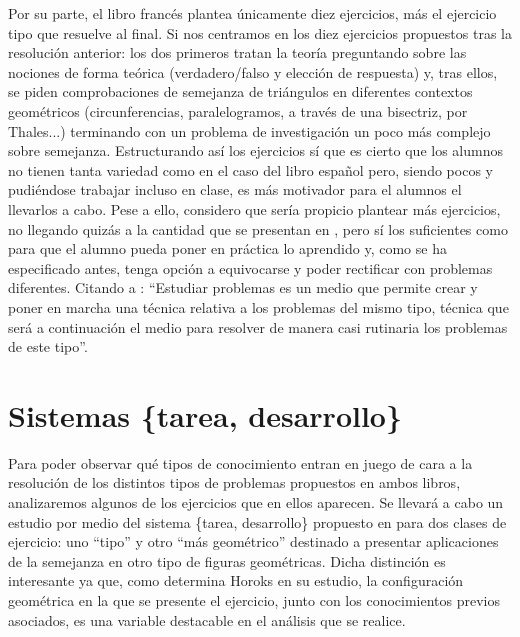 	Por su parte, el libro francés plantea únicamente diez ejercicios, más el ejercicio tipo que resuelve al final. Si nos centramos en los diez ejercicios propuestos tras la resolución anterior: los dos primeros tratan la teoría preguntando sobre las nociones de forma teórica (verdadero/falso y elección de respuesta) y, tras ellos, se piden comprobaciones de semejanza de triángulos en diferentes contextos geométricos (circunferencias, paralelogramos, a través de una bisectriz, por Thales...) terminando con un problema de investigación un poco más complejo sobre semejanza. Estructurando así los ejercicios sí que es cierto que los alumnos no tienen tanta variedad como en el caso del libro español pero, siendo pocos y pudiéndose trabajar incluso en clase, es más motivador para el alumnos el llevarlos a cabo. Pese a ello, considero que sería propicio plantear más ejercicios, no llegando quizás a la cantidad que se presentan en \citet{spa}, pero sí los suficientes como para que el alumno pueda poner en práctica lo aprendido y, como se ha especificado antes, tenga opción a equivocarse y poder rectificar con problemas diferentes. Citando a \citet[p. 243]{Chevallard}: ``Estudiar problemas es un medio que permite crear y poner en marcha una técnica relativa a los problemas del mismo tipo, técnica que será a continuación el medio para resolver de manera casi rutinaria los problemas de este tipo''.
	
\section{Sistemas \{tarea, desarrollo\}}

	Para poder observar qué tipos de conocimiento entran en juego de cara a la resolución de los distintos tipos de problemas propuestos en ambos libros, analizaremos algunos de los ejercicios que en ellos aparecen. Se llevará a cabo un estudio por medio del sistema \{tarea, desarrollo\} propuesto en \citet{Horoks} para dos clases de ejercicio: uno ``tipo'' y otro ``más geométrico'' destinado a presentar aplicaciones de la semejanza en otro tipo de figuras geométricas. Dicha distinción es interesante ya que, como determina Horoks en su estudio, la configuración geométrica en la que se presente el ejercicio, junto con los conocimientos previos asociados, es una variable destacable en el análisis que se realice.
	
